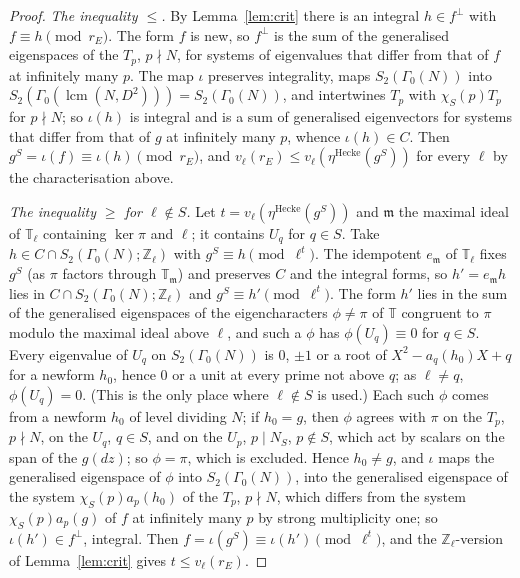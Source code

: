 \documentclass[11pt]{amsart}
\theoremstyle{definition}
\newcommand{\Z}{\mathbb{Z}}
\newcommand{\T}{\mathbb{T}}
\begin{document}
\begin{proof}
\emph{The inequality $\le$.} By Lemma~\ref{lem:crit} there is an integral $h\in f^\perp$ with $f\equiv h\pmod{r_E}$. The form $f$ is new, so $f^\perp$ is the sum of the generalised eigenspaces of the $T_p$, $p\nmid N$, for systems of eigenvalues that differ from that of $f$ at infinitely many $p$. The map $\iota$ preserves integrality, maps $S_2(\Gamma_0(N))$ into $S_2(\Gamma_0(\operatorname{lcm}(N,D^2)))=S_2(\Gamma_0(N))$, and intertwines $T_p$ with $\chi_S(p)T_p$ for $p\nmid N$; so $\iota(h)$ is integral and is a sum of generalised eigenvectors for systems that differ from that of $g$ at infinitely many $p$, whence $\iota(h)\in C$. Then $g^S=\iota(f)\equiv\iota(h)\pmod{r_E}$, and $v_\ell(r_E)\le v_\ell(\eta^{\mathrm{Hecke}}(g^S))$ for every $\ell$ by the characterisation above.

\emph{The inequality $\ge$ for $\ell\notin S$.} Let $t=v_\ell(\eta^{\mathrm{Hecke}}(g^S))$ and $\mathfrak{m}$ the maximal ideal of $\T_\ell$ containing $\ker\pi$ and $\ell$; it contains $U_q$ for $q\in S$. Take $h\in C\cap S_2(\Gamma_0(N);\Z_\ell)$ with $g^S\equiv h\pmod{\ell^t}$. The idempotent $e_{\mathfrak m}$ of $\T_\ell$ fixes $g^S$ (as $\pi$ factors through $\T_{\mathfrak m}$) and preserves $C$ and the integral forms, so $h'=e_{\mathfrak m}h$ lies in $C\cap S_2(\Gamma_0(N);\Z_\ell)$ and $g^S\equiv h'\pmod{\ell^t}$. The form $h'$ lies in the sum of the generalised eigenspaces of the eigencharacters $\phi\ne\pi$ of $\T$ congruent to $\pi$ modulo the maximal ideal above $\ell$, and such a $\phi$ has $\phi(U_q)\equiv0$ for $q\in S$. Every eigenvalue of $U_q$ on $S_2(\Gamma_0(N))$ is $0$, $\pm1$ or a root of $X^2-a_q(h_0)X+q$ for a newform $h_0$, hence $0$ or a unit at every prime not above $q$; as $\ell\ne q$, $\phi(U_q)=0$. (This is the only place where $\ell\notin S$ is used.) Each such $\phi$ comes from a newform $h_0$ of level dividing $N$; if $h_0=g$, then $\phi$ agrees with $\pi$ on the $T_p$, $p\nmid N$, on the $U_q$, $q\in S$, and on the $U_p$, $p\mid N_S$, $p\notin S$, which act by scalars on the span of the $g(dz)$; so $\phi=\pi$, which is excluded. Hence $h_0\ne g$, and $\iota$ maps the generalised eigenspace of $\phi$ into $S_2(\Gamma_0(N))$, into the generalised eigenspace of the system $\chi_S(p)a_p(h_0)$ of the $T_p$, $p\nmid N$, which differs from the system $\chi_S(p)a_p(g)$ of $f$ at infinitely many $p$ by strong multiplicity one; so $\iota(h')\in f^\perp$, integral. Then $f=\iota(g^S)\equiv\iota(h')\pmod{\ell^t}$, and the $\Z_\ell$-version of Lemma~\ref{lem:crit} gives $t\le v_\ell(r_E)$.
\end{proof}
\end{document}
